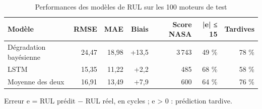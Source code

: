\begin{table}[htbp]
\centering
\caption{Performances des modèles de RUL sur les 100 moteurs de test}
\label{tab:rul_metriques}
\begin{tabular}{lrrrrrr}
\toprule
Modèle & RMSE & MAE & Biais & Score NASA & |e| ≤ 15 & Tardives \\
\midrule
Dégradation bayésienne & 24,47 & 18,98 & +13,5 & 3 743 & 49 \% & 78 \% \\
LSTM & 15,35 & 11,22 & +2,2 & 485 & 68 \% & 58 \% \\
Moyenne des deux & 16,91 & 13,49 & +7,9 & 600 & 64 \% & 76 \% \\
\bottomrule
\end{tabular}
\par\smallskip\footnotesize Erreur e = RUL prédit − RUL réel, en cycles ; e > 0 : prédiction tardive.
\end{table}
